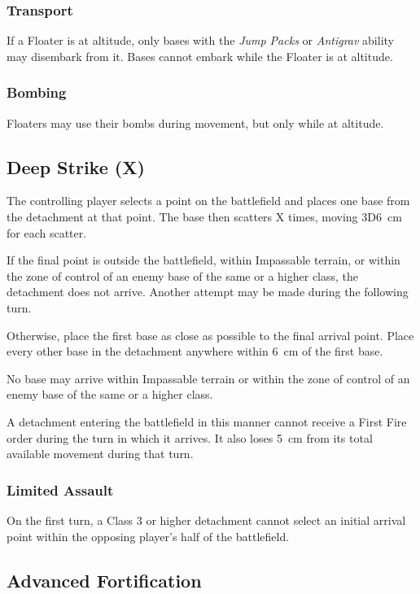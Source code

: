 \subsubsection{Transport}

If a Floater is at altitude, only bases with the \textit{Jump Packs} or \textit{Antigrav} ability may disembark from it. Bases cannot embark while the Floater is at altitude.

\subsubsection{Bombing}

Floaters may use their bombs during movement, but only while at altitude.

\subsection{Deep Strike (X)}

The controlling player selects a point on the battlefield and places one base from the detachment at that point. The base then scatters X times, moving 3D6~cm for each scatter.

If the final point is outside the battlefield, within Impassable terrain, or within the zone of control of an enemy base of the same or a higher class, the detachment does not arrive. Another attempt may be made during the following turn.

Otherwise, place the first base as close as possible to the final arrival point. Place every other base in the detachment anywhere within 6~cm of the first base.

No base may arrive within Impassable terrain or within the zone of control of an enemy base of the same or a higher class.

A detachment entering the battlefield in this manner cannot receive a First Fire order during the turn in which it arrives. It also loses 5~cm from its total available movement during that turn.

\subsubsection{Limited Assault}

On the first turn, a Class 3 or higher detachment cannot select an initial arrival point within the opposing player's half of the battlefield.

\subsection{Advanced Fortification}

